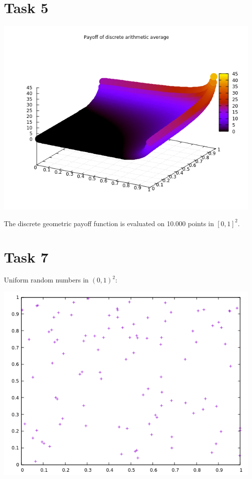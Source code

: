 \documentclass[10pt,a4paper]{article}
\begin{document}
\section*{Task 5}

\begin{center}
\includegraphics[scale=0.5]{payoff_discrete_arithmetic_average.png}
\end{center}
The discrete geometric payoff function is evaluated on 10.000 points in $[0,1]^2$.

\section*{Task 7}

Uniform random numbers in $(0,1)^2$:
\begin{center}
\includegraphics[scale=0.5]{uniform_random_numbers.png}		
\end{center}
\end{document}
